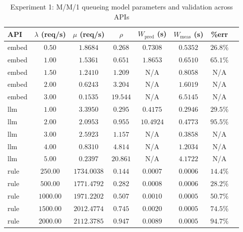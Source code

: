 \begin{table}[htbp]
\centering
\caption{Experiment 1: M/M/1 queueing model parameters and validation across APIs}
\label{tab:short_mm1-metrics}
\begin{tabular}{lccccccc}
\toprule
API & $\lambda$ (req/s) & $\mu$ (req/s) & $\rho$ & $W_{\text{pred}}$ (s) & $W_{\text{meas}}$ (s) & \%err \\
\midrule
embed & $0.50$ & $1.8684$ & $0.268$ & $0.7308$ & $0.5352$ & $26.8\%$ \\
embed & $1.00$ & $1.5361$ & $0.651$ & $1.8653$ & $0.6510$ & $65.1\%$ \\
embed & $1.50$ & $1.2410$ & $1.209$ & N/A & $0.8058$ & N/A \\
embed & $2.00$ & $0.6243$ & $3.204$ & N/A & $1.6019$ & N/A \\
embed & $3.00$ & $0.1535$ & $19.544$ & N/A & $6.5145$ & N/A \\
llm & $1.00$ & $3.3950$ & $0.295$ & $0.4175$ & $0.2946$ & $29.5\%$ \\
llm & $2.00$ & $2.0953$ & $0.955$ & $10.4924$ & $0.4773$ & $95.5\%$ \\
llm & $3.00$ & $2.5923$ & $1.157$ & N/A & $0.3858$ & N/A \\
llm & $4.00$ & $0.8310$ & $4.814$ & N/A & $1.2034$ & N/A \\
llm & $5.00$ & $0.2397$ & $20.861$ & N/A & $4.1722$ & N/A \\
rule & $250.00$ & $1734.0038$ & $0.144$ & $0.0007$ & $0.0006$ & $14.4\%$ \\
rule & $500.00$ & $1771.4792$ & $0.282$ & $0.0008$ & $0.0006$ & $28.2\%$ \\
rule & $1000.00$ & $1971.2202$ & $0.507$ & $0.0010$ & $0.0005$ & $50.7\%$ \\
rule & $1500.00$ & $2012.4774$ & $0.745$ & $0.0020$ & $0.0005$ & $74.5\%$ \\
rule & $2000.00$ & $2112.3785$ & $0.947$ & $0.0089$ & $0.0005$ & $94.7\%$ \\
\bottomrule
\end{tabular}
\end{table}

